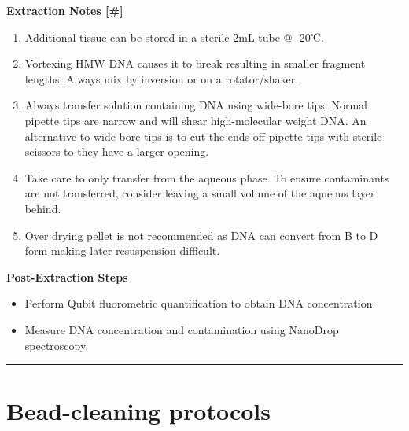 \documentclass[
]{book}
\providecommand{\tightlist}{%
  \setlength{\itemsep}{0pt}\setlength{\parskip}{0pt}}
\begin{document}
\textbf{Extraction Notes {[}\#{]}}~

\begin{enumerate}
\def\labelenumi{\arabic{enumi}.}
\tightlist
\item
  Additional tissue can be stored in a sterile 2mL tube @ -20℃.
\item
  Vortexing HMW DNA causes it to break resulting in smaller fragment lengths. Always mix by inversion or on a rotator/shaker.
\item
  Always transfer solution containing DNA using wide-bore tips. Normal pipette tips are narrow and will shear high-molecular weight DNA. An alternative to wide-bore tips is to cut the ends off pipette tips with sterile scissors to they have a larger opening.
\item
  Take care to only transfer from the aqueous phase. To ensure contaminants are not transferred, consider leaving a small volume of the aqueous layer behind.
\item
  Over drying pellet is not recommended as DNA can convert from B to D form making later resuspension difficult.
\end{enumerate}

\textbf{Post-Extraction Steps}~

\begin{itemize}
\item
  Perform Qubit fluorometric quantification to obtain DNA concentration.~
\item
  Measure DNA concentration and contamination using NanoDrop spectroscopy.~
\end{itemize}

\begin{center}\rule{0.5\linewidth}{0.5pt}\end{center}

\hypertarget{bead-cleaning-protocols}{%
\section{\texorpdfstring{\textbf{Bead-cleaning protocols}}{Bead-cleaning protocols}}\label{bead-cleaning-protocols}}
\end{document}
